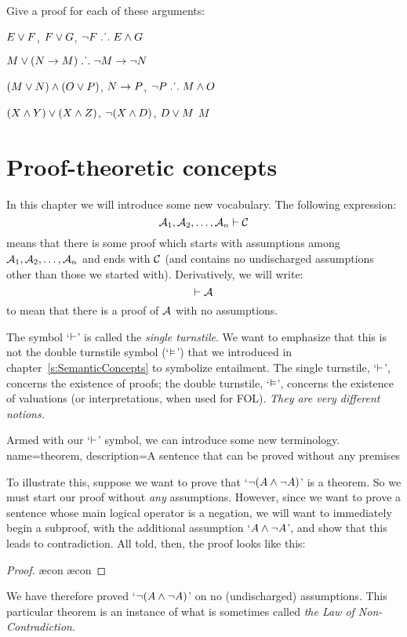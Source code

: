 \problempart 
Give a proof for each of these arguments:
\begin{earg}
\item $E\vee F$, $F\vee G$, $\neg F \mathrel{\ldotp\dot{}\,\ldotp} E \wedge G$
\item $M\vee(N\rightarrow M) \mathrel{\ldotp\dot{}\,\ldotp} \neg M \rightarrow \neg N$
\item $(M \vee N) \wedge (O \vee P)$, $N \rightarrow P$, $\neg P \mathrel{\ldotp\dot{}\,\ldotp} M\wedge O$
\item $(X\wedge Y)\vee(X\wedge Z)$, $\neg(X\wedge D)$, $D\vee M$ \therefore $M$
\end{earg}



\chapter{Proof-theoretic concepts}\label{s:ProofTheoreticConcepts}

In this chapter we will introduce some new vocabulary. The following expression:
$$\mathcal{A}_1, \mathcal{A}_2, \ldots, \mathcal{A}_n \vdash \mathcal{C}$$
means that there is some proof which starts with assumptions among $\mathcal{A}_1, \mathcal{A}_2, \ldots, \mathcal{A}_n$ and ends with $\mathcal{C}$ (and contains no undischarged assumptions other than those we started with). Derivatively, we will write:
$$\vdash \mathcal{A}$$
to mean that there is a proof of $\mathcal{A}$ with no assumptions. 

The symbol `$\vdash$' is called the \emph{single turnstile}. We want to emphasize that this is not the {double turnstile} symbol (`$\vDash$') that we introduced in chapter~\ref{s:SemanticConcepts} to symbolize entailment. The single turnstile, `$\vdash$', concerns the existence of proofs; the double turnstile, `$\vDash$', concerns the existence of valuations (or interpretations, when used for FOL). \emph{They are very different notions.}

Armed with our `$\vdash$' symbol, we can introduce some new terminology.
{
name=theorem,
description={A sentence that can be proved without any premises}
}

        To illustrate this, suppose we want to prove that `$\neg (A \wedge \neg A)$' is a theorem. So we must start our proof without \emph{any} assumptions. However, since we want to prove a sentence whose main logical operator is a negation, we will want to  immediately begin a subproof, with the additional assumption `$A \wedge \neg A$', and show that this leads to contradiction. All told, then, the proof looks like this:
	\begin{proof}
		\open
			\ae{con}
			\ae{con}
		\close
	\end{proof}
We have therefore proved `$\neg (A \wedge \neg A)$' on no (undischarged) assumptions. This particular theorem is an instance of what is sometimes called \emph{the Law of Non-Contradiction}.

